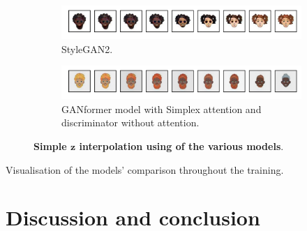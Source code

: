 \documentclass{article}
\begin{document}
	\begin{figure}[ht]
		\centering
		\begin{subfigure}{\linewidth}
			\includegraphics[width=\linewidth]{../src/trained_network/out_imgs/interpolation_Stylegan2_300kimg.png}
			\vspace{-7mm}
			\caption{StyleGAN2.} 
		\end{subfigure}
		\begin{subfigure}{\linewidth}
			\includegraphics[width=\linewidth]{../src/trained_network/out_imgs/interpolation_GANFormer_Simplex_D_StyleGAN_300kimg.png}
			\vspace{-7mm}
			\caption{GANformer model with Simplex attention and discriminator without attention.}
		\end{subfigure}
		\vspace{3mm}
		\caption{\textbf{Simple $\mathbf{z}$ interpolation using of the various 
		models}.}\label{fig:interpolation}
	\end{figure}

	Visualisation of the models' comparison throughout the training. 

	
	
	
	
	\section{Discussion and conclusion}%
	
	
	\clearpage %
	
	
	\clearpage
	
\end{document}
